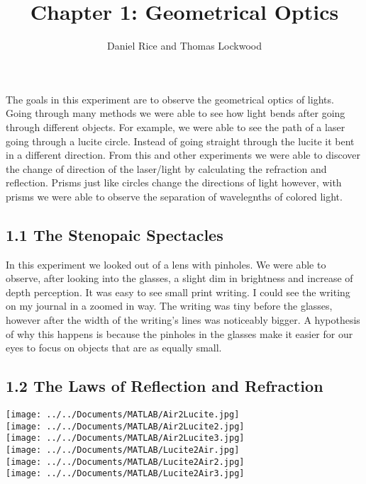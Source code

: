 \documentclass[12pt, oneside]{article}   	%
\title{Chapter 1: Geometrical Optics}
\author{Daniel Rice and Thomas Lockwood}
\date{}							%
\begin{document}
\maketitle{}
\abstract
The goals in this experiment are to observe the geometrical optics of lights.
Going through many methods we were able to see how light bends after going through different objects.
For example, we were able to see the path of a laser going through a lucite circle.
Instead of going straight through the lucite it bent in a different direction.
From this and other experiments we were able to discover the change of direction of the laser/light by calculating the refraction and reflection.
Prisms just like circles change the directions of light however, with prisms we were able to observe the separation of wavelegnths of colored light.


\subsection*{1.1 The Stenopaic Spectacles}
In this experiment we looked out of a lens with pinholes. 
We were able to observe, after looking into the glasses, a slight dim in brightness and increase of depth perception. 
It was easy to see small print writing. 
I could see the writing on my journal in a zoomed in way. 
The writing was tiny before the glasses, however after the width of the writing's lines was noticeably bigger. 
A hypothesis of why this happens is because the pinholes in the glasses make it easier for our eyes to focus on objects that are as equally small.

\subsection*{1.2 The Laws of Reflection and Refraction}
\texttt{[image: ../../Documents/MATLAB/Air2Lucite.jpg]} 
\\
\texttt{[image: ../../Documents/MATLAB/Air2Lucite2.jpg]} 
\\
\texttt{[image: ../../Documents/MATLAB/Air2Lucite3.jpg]} 
\\
\texttt{[image: ../../Documents/MATLAB/Lucite2Air.jpg]} 
\\
\texttt{[image: ../../Documents/MATLAB/Lucite2Air2.jpg]} 
\\
\texttt{[image: ../../Documents/MATLAB/Lucite2Air3.jpg]} 
\end{document}
